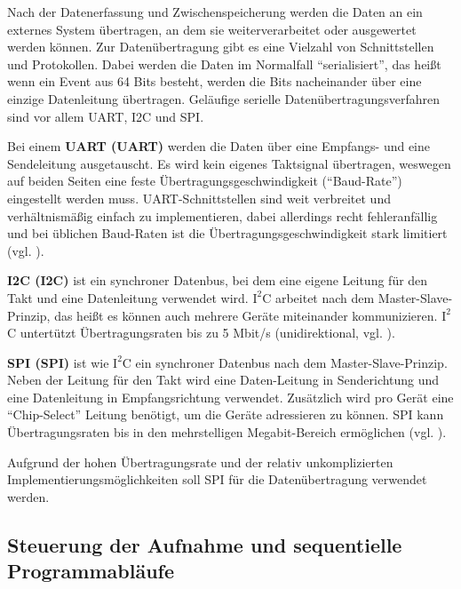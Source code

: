 Nach der Datenerfassung und Zwischenspeicherung werden die Daten an ein externes System übertragen, an dem sie weiterverarbeitet oder ausgewertet werden können. Zur Datenübertragung gibt es eine Vielzahl von Schnittstellen und Protokollen. Dabei werden die Daten im Normalfall ``serialisiert'', das heißt wenn ein Event aus 64 Bits besteht, werden die Bits nacheinander über eine einzige Datenleitung übertragen. Geläufige serielle Datenübertragungsverfahren sind vor allem \acrshort{UART}, \acrshort{I2C} und \acrshort{SPI}.
\begin{description}
	\item Bei einem \textbf{UART (\acrlong{UART})} werden die Daten über eine Empfangs- und eine Sendeleitung ausgetauscht. Es wird kein eigenes Taktsignal übertragen, weswegen auf beiden Seiten eine feste Übertragungsgeschwindigkeit (``Baud-Rate'') eingestellt werden muss. UART-Schnittstellen sind weit verbreitet und verhältnismäßig einfach zu implementieren, dabei allerdings recht fehleranfällig und bei üblichen Baud-Raten ist die Übertragungsgeschwindigkeit stark limitiert (vgl. \cite{wiki:UART}).
	\item \textbf{\acrshort{I2C} (\acrlong{I2C})} ist ein synchroner Datenbus, bei dem eine eigene Leitung für den Takt und eine Datenleitung verwendet wird. $\text{I}^2$C arbeitet nach dem Master-Slave-Prinzip, das heißt es können auch mehrere Geräte miteinander kommunizieren. $\text{I}^2$C untertützt Übertragungsraten bis zu 5 Mbit/s (unidirektional, vgl. \cite{wiki:I2C}).
	\item \textbf{\acrshort{SPI} (\acrlong{SPI})} ist wie $\text{I}^2$C ein synchroner Datenbus nach dem Master-Slave-Prinzip. Neben der Leitung für den Takt wird eine Daten-Leitung in Senderichtung und eine Datenleitung in Empfangsrichtung verwendet. Zusätzlich wird pro Gerät eine ``Chip-Select'' Leitung benötigt, um die Geräte adressieren zu können. SPI kann Übertragungsraten bis in den mehrstelligen Megabit-Bereich ermöglichen (vgl. \cite{wiki:SPI}).
\end{description}

Aufgrund der hohen Übertragungsrate und der relativ unkomplizierten Implementierungsmöglichkeiten soll SPI für die Datenübertragung verwendet werden.


\subsection{Steuerung der Aufnahme und sequentielle Programmabläufe}

